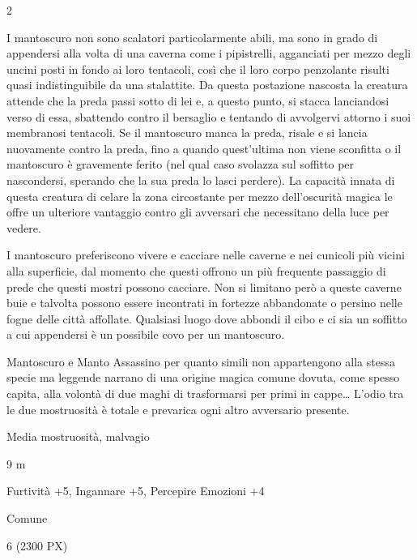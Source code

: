 \begin{multicols}{2}
{I mantoscuro non sono scalatori particolarmente abili, ma sono in grado di appendersi alla volta di una caverna come i pipistrelli, agganciati per mezzo degli uncini posti in fondo ai loro tentacoli, così che il loro corpo penzolante risulti quasi indistinguibile da una stalattite. Da questa postazione nascosta la creatura attende che la preda passi sotto di lei e, a questo punto, si stacca lanciandosi verso di essa, sbattendo contro il bersaglio e tentando di avvolgervi attorno i suoi membranosi tentacoli. Se il mantoscuro manca la preda, risale e si lancia nuovamente contro la preda, fino a quando quest'ultima non viene sconfitta o il mantoscuro è gravemente ferito (nel qual caso svolazza sul soffitto per nascondersi, sperando che la sua preda lo lasci perdere). La capacità innata di questa creatura di celare la zona circostante per mezzo dell'oscurità magica le offre un ulteriore vantaggio contro gli avversari che necessitano della luce per vedere.

I mantoscuro preferiscono vivere e cacciare nelle caverne e nei cunicoli più vicini alla superficie, dal momento che questi offrono un più frequente passaggio di prede che questi mostri possono cacciare. Non si limitano però a queste caverne buie e talvolta possono essere incontrati in fortezze abbandonate o persino nelle fogne delle città affollate. Qualsiasi luogo dove abbondi il cibo e ci sia un soffitto a cui appendersi è un possibile covo per un mantoscuro.

Mantoscuro e Manto Assassino per quanto simili non appartengono alla stessa specie ma leggende narrano di una origine magica comune dovuta, come spesso capita, alla volontà di due maghi di trasformarsi per primi in cappe… L'odio tra le due mostruosità è totale e prevarica ogni altro avversario presente.

\begin{description}[noitemsep, topsep=0pt, parsep=0pt, partopsep=0pt, itemsep=1pt, leftmargin=2.35cm,  labelwidth=2.2cm, itemindent=0cm, listparindent=0pt] %
\setlength{\baselineskip}{10pt}
\item[\textbf{Taglia/Tipo}] Media mostruosità, malvagio
\item[\textbf{Caratt.}] 
\item[\textbf{Punti Ferita}] 
\item[\textbf{Movimento}] 9 m
\item[\textbf{Tiri Salvez.}] 
\item[\textbf{Comp.}] Furtività +5, Ingannare +5, Percepire Emozioni +4
\item[\textbf{Sensi}] 
\item[\textbf{Linguaggi}] Comune
\item[\textbf{Sfida}] 6 (2300 PX)
\end{description}
\smallskip

}
\end{multicols}
